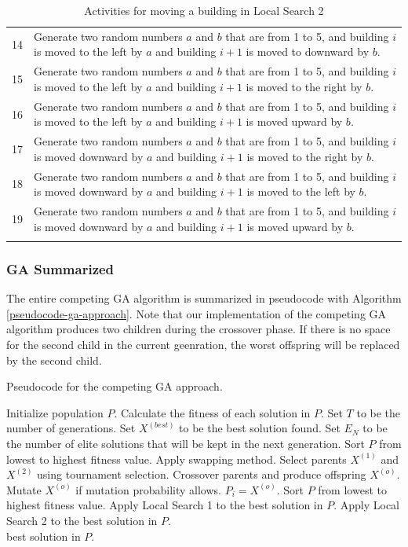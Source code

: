 \begin{longtable}{| c | p{120mm} |}
	14 & Generate two random numbers $a$ and $b$ that are from 1 to 5, and building $i$ is moved to the left by $a$ and building $i + 1$ is moved to downward by $b$. \\
	15 & Generate two random numbers $a$ and $b$ that are from 1 to 5, and building $i$ is moved to the left by $a$ and building $i + 1$ is moved to the right by $b$. \\
	16 & Generate two random numbers $a$ and $b$ that are from 1 to 5, and building $i$ is moved to the left by $a$ and building $i + 1$ is moved upward by $b$. \\
	17 & Generate two random numbers $a$ and $b$ that are from 1 to 5, and building $i$ is moved downward by $a$ and building $i + 1$ is moved to the right by $b$. \\
	18 & Generate two random numbers $a$ and $b$ that are from 1 to 5, and building $i$ is moved downward by $a$ and building $i + 1$ is moved to the left by $b$. \\
	19 & Generate two random numbers $a$ and $b$ that are from 1 to 5, and building $i$ is moved downward by $a$ and building $i + 1$ is moved upward by $b$. \\
	\hline
	\caption{Activities for moving a building in Local Search 2}
	\label{local-search-2-activities}
\end{longtable}

\subsubsection{GA Summarized}
The entire competing GA algorithm is summarized in pseudocode with Algorithm \ref{pseudocode-ga-approach}. Note that our implementation of the competing GA algorithm produces two children during the crossover phase. If there is no space for the second child in the current geenration, the worst offspring will be replaced by the second child.

\begin{algorithm}
\caption{Pseudocode for the competing GA approach.}
\label{pseudocode-ga-approach}
\begin{algorithmic}[1]
\State Initialize population $P$.
\State Calculate the fitness of each solution in $P$.
\State Set $T$ to be the number of generations.
\State Set $X^{(best)}$ to be the best solution found.
\State Set $E_{N}$ to be the number of elite solutions that will be kept in the next generation.
\State Sort $P$ from lowest to highest fitness value.
		\State Apply swapping method.
	\EndIf
		\State Select parents $X^{(1)}$ and $X^{(2)}$ using tournament selection.
		\State Crossover parents and produce offspring $X^{(o)}$.
		\State Mutate $X^{(o)}$ if mutation probability allows.
		\State $P_{i} = X^{(o)}$.
	\EndFor
	\State Sort $P$ from lowest to highest fitness value.
	\State Apply Local Search 1 to the best solution in $P$.
		\State Apply Local Search 2 to the best solution in $P$.
	\EndIf
\EndFor \\
\Return best solution in $P$.
\end{algorithmic}
\end{algorithm}

